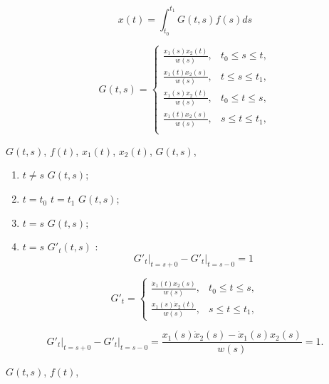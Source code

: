 \documentclass{article}
\theoremstyle{plain} \newtheorem*{theorem*}{Теорема}
\theoremstyle{plain} \newtheorem{theorem}{Теорема}[section]
\theoremstyle{definition} \newtheorem*{corollary*}{Следствие}
\theoremstyle{definition} \newtheorem{corollary}{Следствие}[section]
\theoremstyle{remark} \newtheorem*{example*}{Пример}
\begin{document}
\begin{equation}
    x(t) = \int^{t_1}_{t_0} G(t, s) f(s) ds
\end{equation}

\begin{equation}
    G(t,s) =
    \begin{cases}
        \frac{x_1(s) x_2(t)}{w(s)} , &t_0 \le s \le t,\\
        \frac{x_1(t) x_2(s)}{w(s)} , &t \le s \le t_1,\\
        \frac{x_1(s) x_2(t)}{w(s)} , &t_0 \le t \le s,\\
        \frac{x_1(t) x_2(s)}{w(s)} , &s \le t \le t_1,\\
    \end{cases}
\end{equation}

$G(t,s)$,
$f(t)$,
$x_1(t)$,
$x_2(t)$,
$G(t,s)$,

\begin{enumerate}
    \item $t \ne s$ $G(t,s)$;
    \item $t = t_0$ $t = t_1$ $G(t,s)$;
    \item $t = s$ $G(t,s)$;
    \item $t = s$ $G'_t(t,s)$ :
        \begin{equation*}
            G'_t \vert_{t = s + 0} - G'_t \vert_{t = s - 0} = 1
        \end{equation*}
\end{enumerate}

\begin{equation*}
    G'_t =
    \begin{cases}
        \frac{\dot{x}_1(t) x_2(s)}{w(s)}, &t_0 \le t \le s, \\
        \frac{x_1(s) \dot{x}_2(t)}{w(s)}, &s \le t \le t_1,
    \end{cases}
\end{equation*}

\begin{equation*}
    G'_t \vert_{t = s + 0} - G'_t \vert_{t = s - 0} =
    \frac{x_1(s) \dot{x}_2(s) - \dot{x}_1(s) x_2(s)}{w(s)} = 1.
\end{equation*}

$G(t,s)$,
$f(t)$,
\end{document}
